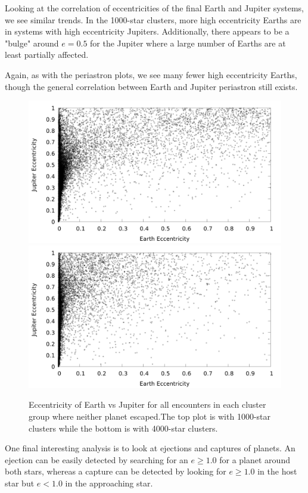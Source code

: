 \documentclass[12pt]{article}
\begin{document}
    Looking at the correlation of eccentricities of the final Earth
    and Jupiter systems, we see similar trends. In the 1000-star clusters,
    more high eccentricity Earths are in systems with high eccentricity Jupiters.
    Additionally, there appears to be a "bulge" around $e=0.5$ for the Jupiter
    where a large number of Earths are at least partially affected.

    Again, as with the periastron plots, we see many fewer high eccentricity
    Earths, though the general correlation between Earth and Jupiter periastron still
    exists.

    \begin{figure}[H]
        \caption{Eccentricity of Earth vs Jupiter for all encounters
            in each cluster group where neither planet escaped.The top
            plot is with 1000-star clusters while the bottom is with 4000-star
            clusters.
        }
        \centering
        \includegraphics[width=5in]{evj_ecc_earth_jupiter_1000} 
        \includegraphics[width=5in]{evj_ecc_earth_jupiter_4000} 
    \end{figure}

    One final interesting analysis is to look at ejections and captures of planets.
    An ejection can be easily detected by searching for an $e \ge 1.0$ for a planet
    around both stars, whereas a capture can be detected by looking for $e \ge 1.0$ in
    the host star but $e < 1.0$ in the approaching star.
\end{document}
